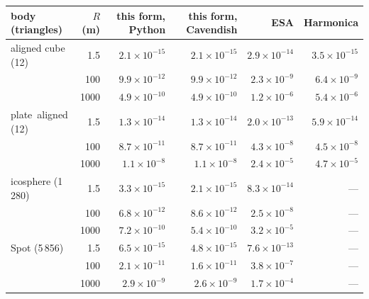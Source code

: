 \begin{tabular}{lrrrrr}
\toprule
body (triangles) & $R$ (m) & this form, Python & this form, Cavendish & ESA & Harmonica \\
\midrule
aligned cube (12) & 1.5 & $2.1\times10^{-15}$ & $2.1\times10^{-15}$ & $2.9\times10^{-14}$ & $3.5\times10^{-15}$ \\
 & 100 & $9.9\times10^{-12}$ & $9.9\times10^{-12}$ & $2.3\times10^{-9}$ & $6.4\times10^{-9}$ \\
 & 1000 & $4.9\times10^{-10}$ & $4.9\times10^{-10}$ & $1.2\times10^{-6}$ & $5.4\times10^{-6}$ \\
plate\, aligned (12) & 1.5 & $1.3\times10^{-14}$ & $1.3\times10^{-14}$ & $2.0\times10^{-13}$ & $5.9\times10^{-14}$ \\
 & 100 & $8.7\times10^{-11}$ & $8.7\times10^{-11}$ & $4.3\times10^{-8}$ & $4.5\times10^{-8}$ \\
 & 1000 & $1.1\times10^{-8}$ & $1.1\times10^{-8}$ & $2.4\times10^{-5}$ & $4.7\times10^{-5}$ \\
icosphere (1\,280) & 1.5 & $3.3\times10^{-15}$ & $2.1\times10^{-15}$ & $8.3\times10^{-14}$ & --- \\
 & 100 & $6.8\times10^{-12}$ & $8.6\times10^{-12}$ & $2.5\times10^{-8}$ & --- \\
 & 1000 & $7.2\times10^{-10}$ & $5.4\times10^{-10}$ & $3.2\times10^{-5}$ & --- \\
Spot (5\,856) & 1.5 & $6.5\times10^{-15}$ & $4.8\times10^{-15}$ & $7.6\times10^{-13}$ & --- \\
 & 100 & $2.1\times10^{-11}$ & $1.6\times10^{-11}$ & $3.8\times10^{-7}$ & --- \\
 & 1000 & $2.9\times10^{-9}$ & $2.6\times10^{-9}$ & $1.7\times10^{-4}$ & --- \\
\bottomrule
\end{tabular}
